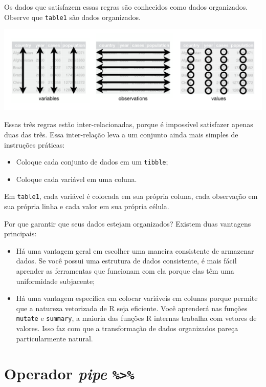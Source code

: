 \documentclass[]{book}
\begin{document}
Os dados que satisfazem essas regras são conhecidos como dados organizados. Observe que \texttt{table1} são dados organizados.

\begin{center}\includegraphics[width=0.9\linewidth]{imagens/tidy-1} \end{center}

Essas três regras estão inter-relacionadas, porque é impossível satisfazer apenas duas das três. Essa inter-relação leva a um conjunto ainda mais simples de instruções práticas:

\begin{itemize}
\item
  Coloque cada conjunto de dados em um \texttt{tibble};
\item
  Coloque cada variável em uma coluna.
\end{itemize}

Em \texttt{table1}, cada variável é colocada em sua própria coluna, cada observação em sua própria linha e cada valor em sua própria célula.

Por que garantir que seus dados estejam organizados? Existem duas vantagens principais:

\begin{itemize}
\item
  Há uma vantagem geral em escolher uma maneira consistente de armazenar dados. Se você possui uma estrutura de dados consistente, é mais fácil aprender as ferramentas que funcionam com ela porque elas têm uma uniformidade subjacente;
\item
  Há uma vantagem específica em colocar variáveis em colunas porque permite que a natureza vetorizada de R seja eficiente. Você aprenderá nas funções \texttt{mutate} e \texttt{summary}, a maioria das funções R internas trabalha com vetores de valores. Isso faz com que a transformação de dados organizados pareça particularmente natural.
\end{itemize}

\hypertarget{operador-pipe}{%
\section{\texorpdfstring{Operador \emph{pipe} \texttt{\%\textgreater{}\%}}{Operador pipe \%\textgreater\%}}\label{operador-pipe}}
\end{document}
